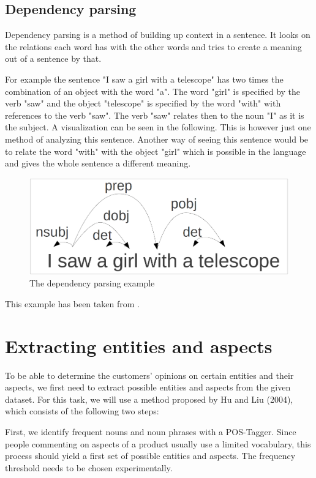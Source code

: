 \documentclass[10pt,a4paper]{article}
\begin{document}
		\subsection{Dependency parsing}
		
		Dependency parsing is a method of building up context in a sentence.
		It looks on the relations each word has with the other words and tries to create a meaning out of a sentence by that.
		
		For example the sentence "I saw a girl with a telescope" has two times the combination of an object with the word "a". 
		The word "girl" is specified by the verb "saw" and the object "telescope" is specified by the word "with" with references to the verb "saw". 
		The verb "saw" relates then to the noun "I" as it is the subject. 		
		A visualization can be seen in the following.
		This is however just one method of analyzing this sentence.
		Another way of seeing this sentence would be to relate the word "with" with the object "girl" which is possible in the language and gives the whole sentence a different meaning.
		
		\begin{figure}[h]
			\centering
			\includegraphics[width=0.8\linewidth]{data/dependency}
			\caption{The dependency parsing example}
			\label{fig:dependency}
		\end{figure}
		
		This example has been taken from \cite{dependency}.
	
	\section{Extracting entities and aspects}
	To be able to determine the customers' opinions on certain entities and their aspects, we first need to extract possible entities and aspects from the given dataset. For this task, we will use a method proposed by Hu and Liu (2004), which consists of the following two steps:
	
	First, we identify frequent nouns and noun phrases with a POS-Tagger. Since people commenting on aspects of a product usually use a limited vocabulary, this process should yield a first set of possible entities and aspects. The frequency threshold needs to be chosen experimentally.
	
\end{document}
